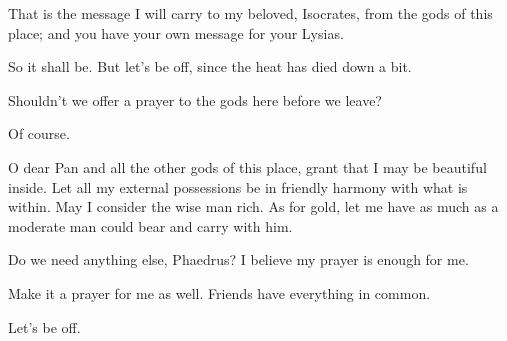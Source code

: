 That is the message I will carry to my beloved, Isocrates, from the gods
of this place; and you have your own message for your Lysias.

\sayphaedrus So it shall be. But let's be off, since the heat has died down
a bit.

\saysocrates Shouldn't we offer a prayer to the gods here before we leave?

\sayphaedrus Of course.

\saysocrates O dear Pan and all the other gods of this place, grant that I
may be beautiful inside. Let all my external possessions be in friendly 
harmony with what is within. May I consider the wise man rich.
As for gold, let me have as much as a moderate man
could bear and carry with him.

Do we need anything else, Phaedrus? I believe my prayer is enough for
me.

\sayphaedrus Make it a prayer for me as well. Friends have everything in
common.

\saysocrates Let's be off.\crlf
\crlf


